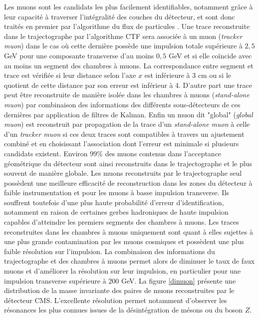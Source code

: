Les muons sont les candidats les plus facilement identifiables, notamment grâce à leur capacité à traverser l'intégralité des couches du détecteur, et sont donc traités en premier par l'algorithme du flux de particules \cite{Sirunyan:2313130}. Une trace reconstruite dans le trajectographe par l'algorithme CTF sera associée à un muon (\textit{tracker muon}) dans le cas où cette dernière possède une impulsion totale supérieure à $2,5$ GeV pour une composante transverse d'au moins $0,5$ GeV et si elle coïncide avec au moins un segment des chambres à muons. La correspondance entre segment et trace est vérifiée si leur distance selon l'axe $x$ est inférieure à $3$ cm ou si le quotient de cette distance par son erreur est inférieur à 4. D'autre part une trace peut être reconstruite de manière isolée dans les chambres à muons (\textit{stand-alone muon}) par combinaison des informations des différents sous-détecteurs de ces dernières par application de filtres de Kalman. Enfin un muon dit "global" (\textit{global muon}) est reconstruit par propagation de la trace d'un \textit{stand-alone muon} à celle d'un \textit{tracker muon} si ces deux traces sont compatibles à travers un ajustement combiné et en choisissant l'association dont l'erreur est minimale si plusieurs candidats existent. Environ $99$\% des muons contenus dans l'acceptance géométrique du détecteur sont ainsi reconstruits dans le trajectographe et le plus souvent de manière globale. Les muons reconstruits par le trajectographe seul possèdent une meilleure efficacité de reconstruction dans les zones du détecteur à faible instrumentation et pour les muons à basse impulsion transverse. Ils souffrent toutefois d'une plus haute probabilité d'erreur d'identification, notamment en raison de certaines gerbes hadroniques de haute impulsion capables d'atteindre les premiers segments des chambres à muons. Les traces reconstruites dans les chambres à muons uniquement sont quant à elles sujettes à une plus grande contamination par les muons cosmiques et possèdent une plus faible résolution sur l'impulsion. La combinaison des informations du trajectographe et des chambres à muons permet alors de diminuer le taux de faux muons et d'améliorer la résolution sur leur impulsion, en particulier pour une impulsion transverse supérieure à $200$ GeV. La figure \ref{dimuon} présente une distribution de la masse invariante des paires de muons reconstruites par le détecteur CMS. L'excellente résolution permet notamment d'observer les résonances les plus connues issues de la désintégration de mésons ou du boson $Z$. \\

